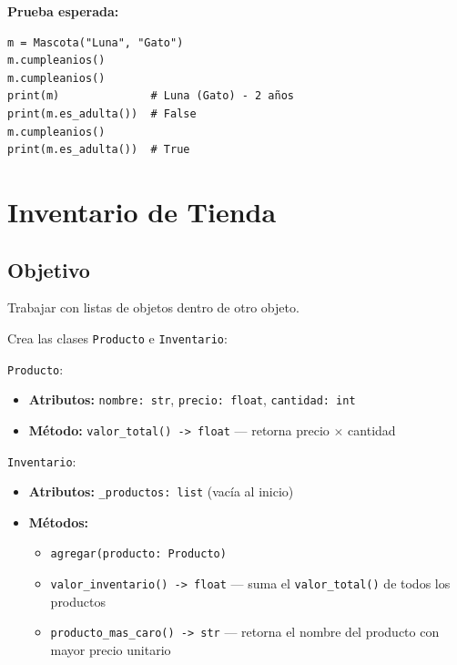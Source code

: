 \documentclass[11pt,letterpaper]{article}
\begin{document}
\textbf{Prueba esperada:}
\begin{lstlisting}
m = Mascota("Luna", "Gato")
m.cumpleanios()
m.cumpleanios()
print(m)              # Luna (Gato) - 2 años
print(m.es_adulta())  # False
m.cumpleanios()
print(m.es_adulta())  # True
\end{lstlisting}


\vspace{.5cm}
\hfill{}
\vspace{2pt}

\section{Inventario de Tienda}
\subsection{Objetivo} Trabajar con listas de objetos dentro de otro objeto.

Crea las clases \texttt{Producto} e \texttt{Inventario}:

\texttt{Producto}:
\begin{itemize}[nosep]
  \item \textbf{Atributos:} \texttt{nombre: str}, \texttt{precio: float}, \texttt{cantidad: int}
  \item \textbf{Método:} \texttt{valor\_total() -> float} --- retorna precio $\times$ cantidad
\end{itemize}

\texttt{Inventario}:
\begin{itemize}[nosep]
  \item \textbf{Atributos:} \texttt{\_productos: list} (vacía al inicio)
  \item \textbf{Métodos:}
  \begin{itemize}[nosep]
    \item \texttt{agregar(producto: Producto)}
    \item \texttt{valor\_inventario() -> float} --- suma el \texttt{valor\_total()} de todos los productos
    \item \texttt{producto\_mas\_caro() -> str} --- retorna el nombre del producto con mayor precio unitario
  \end{itemize}
\end{itemize}
\end{document}
